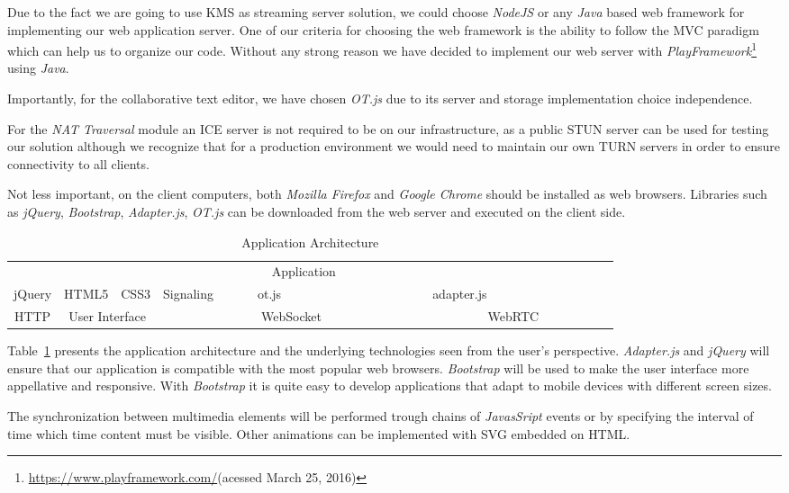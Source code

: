 Due to the fact we are going to use \ac{KMS} as streaming server solution, we could choose \emph{NodeJS} or any \emph{Java} based web framework for implementing our web application server. One of our criteria for choosing the web framework is the ability to follow the \ac{MVC} paradigm which can help us to organize our code. Without any strong reason we have decided to implement our web server with \emph{PlayFramework}\footnote{\url{https://www.playframework.com/}(acessed March 25, 2016)} using \emph{Java}.

Importantly, for the collaborative text editor, we have chosen \emph{OT.js} due to its server and storage implementation choice independence.

For the \emph{NAT Traversal} module an \ac{ICE} server is not required to be on our infrastructure, as a public \ac{STUN} server can be used for testing our solution although we recognize that for a production environment we would need to maintain our own \ac{TURN} servers in order to ensure connectivity to all clients.

Not less important, on the client computers, both \emph{Mozilla Firefox} and \emph{Google Chrome} should be installed as web browsers. Libraries such as \emph{jQuery}, \emph{Bootstrap}, \emph{Adapter.js}, \emph{OT.js} can be downloaded from the web server and executed on the client side.

\begin{table}[H]
\centering
	\caption{Application Architecture}
	\label{table:apparch}
    \begin{tabular}{cccccccc@{}m{0pt}@{}}
	\hline 
\multicolumn{8}{|c|}{\cellcolor{Gray}Application}  &\\[12pt]\cline{1-5}\cline{7-7}
\multicolumn{1}{|c|}{jQuery} & \multicolumn{1}{c|}{HTML5} & \multicolumn{1}{c|}{CSS3} & \multicolumn{1}{c|}{Signaling} & \multicolumn{1}{c|}{~~~~~ot.js~~~~~} & \multicolumn{1}{c|}{\cellcolor{Gray}~~~~~~~~~~~~~~~} & \multicolumn{1}{c|}{adapter.js} &   \multicolumn{1}{c|}{\cellcolor{Gray}~~~~~~~~~~~~~~~} &\\[12pt]\hline
\multicolumn{1}{|c|}{HTTP} & \multicolumn{2}{c|}{User Interface}  & \multicolumn{3}{c|}{WebSocket}    & \multicolumn{2}{c|}{WebRTC}      &\\[12pt]\hline
\end{tabular}
\end{table}

Table~\ref{table:apparch} presents the application architecture and the underlying technologies seen from the user's perspective. \emph{Adapter.js} and \emph{jQuery} will ensure that our application is compatible with the most popular web browsers.
\emph{Bootstrap} will be used to make the user interface more appellative and responsive. With \emph{Bootstrap} it is quite easy to develop applications that adapt to mobile devices with different screen sizes.

The synchronization between multimedia elements will be performed trough chains of \emph{JavasSript} events or by specifying the interval of time which time content must be visible. Other animations can be implemented with \ac{SVG} embedded on \ac{HTML}.

